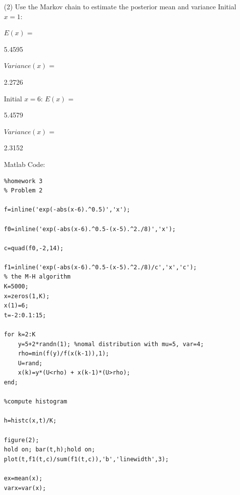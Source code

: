 \documentclass[12pt] {article}
\begin{document}
(2) Use the Markov chain to estimate the posterior mean and variance
Initial $x=1$:

$E(x)$ =

    5.4595


$Variance(x)$ =

    2.2726

Initial $x=6$:
$E(x)$ =

    5.4579


$Variance(x)$ =

    2.3152
    
    
Matlab Code:
\begin{lstlisting}
%homework 3
% Problem 2

f=inline('exp(-abs(x-6).^0.5)','x');

f0=inline('exp(-abs(x-6).^0.5-(x-5).^2./8)','x');

c=quad(f0,-2,14);

f1=inline('exp(-abs(x-6).^0.5-(x-5).^2./8)/c','x','c');
% the M-H algorithm
K=5000;
x=zeros(1,K);
x(1)=6;
t=-2:0.1:15;

for k=2:K
    y=5+2*randn(1); %nomal distribution with mu=5, var=4;
    rho=min(f(y)/f(x(k-1)),1);
    U=rand;
    x(k)=y*(U<rho) + x(k-1)*(U>rho);
end;

%compute histogram

h=histc(x,t)/K;

figure(2);
hold on; bar(t,h);hold on;
plot(t,f1(t,c)/sum(f1(t,c)),'b','linewidth',3);

ex=mean(x);
varx=var(x);

\end{lstlisting}
\end{document}
